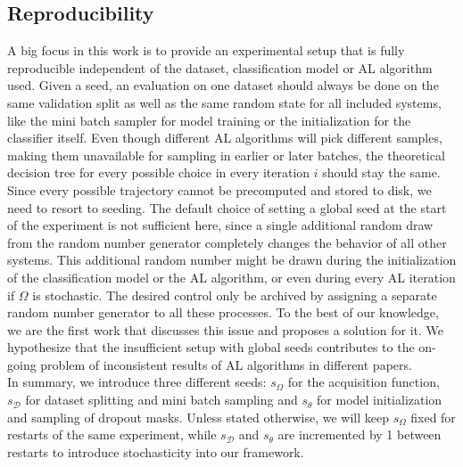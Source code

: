 \documentclass[]{article}
\begin{document}
\subsection{Reproducibility}\label{sec:reproducibility}
A big focus in this work is to provide an experimental setup that is fully reproducible independent of the dataset, classification model or AL algorithm used.
Given a seed, an evaluation on one dataset should always be done on the same validation split as well as the same random state for all included systems, like the mini batch sampler for model training or the initialization for the classifier itself.
Even though different AL algorithms will pick different samples, making them unavailable for sampling in earlier or later batches, the theoretical decision tree for every possible choice in every iteration $i$ should stay the same.
Since every possible trajectory cannot be precomputed and stored to disk, we need to resort to seeding.
The default choice of setting a global seed at the start of the experiment is not sufficient here, since a single additional random draw from the random number generator completely changes the behavior of all other systems.
This additional random number might be drawn during the initialization of the classification model or the AL algorithm, or even during every AL iteration if $\Omega$ is stochastic.
The desired control only be archived by assigning a separate random number generator to all these processes.
To the best of our knowledge, we are the first work that discusses this issue and proposes a solution for it.
We hypothesize that the insufficient setup with global seeds contributes to the on-going problem of inconsistent results of AL algorithms in different papers. \\ [1mm]
In summary, we introduce three different seeds: $s_\Omega$ for the acquisition function, $s_\mathcal{D}$ for dataset splitting and mini batch sampling and $s_\theta$ for model initialization and sampling of dropout masks.
Unless stated otherwise, we will keep $s_\Omega$ fixed for restarts of the same experiment, while $s_\mathcal{D}$ and $s_\theta$ are incremented by 1 between restarts to introduce stochasticity into our framework.

\end{document}

